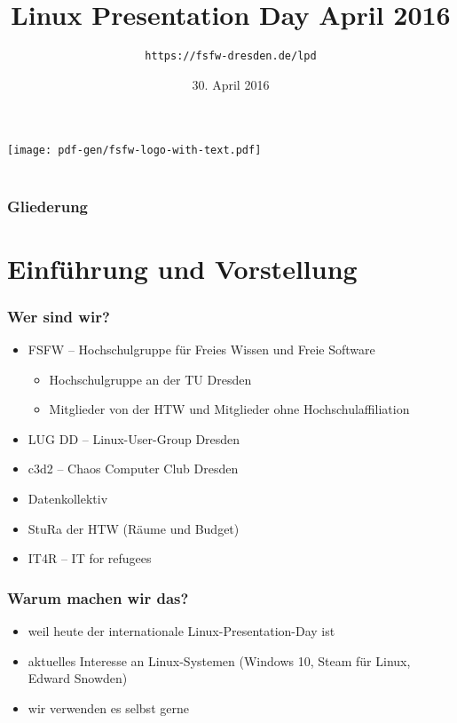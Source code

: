 \documentclass[t]{beamer}
\title{Linux Presentation Day April 2016}
\author{\texttt{https://fsfw-dresden.de/lpd}}
\date[30.04.2016]{30. April 2016}
\begin{document}
\begin{frame}
  \begin{center}%
\texttt{[image: pdf-gen/fsfw-logo-with-text.pdf]}\\%
\vspace*{-1em}{Freie Software Freies Wissen}\\[1em]
  \end{center}
\end{frame}

\begin{frame}
  \frametitle{Gliederung}
  \tableofcontents
\end{frame}

\section{Einführung und Vorstellung}
\begin{frame}
  \frametitle{Wer sind wir?}
  \begin{itemize}
  \item FSFW – Hochschulgruppe für Freies Wissen und Freie Software
    \begin{itemize}
    \item Hochschulgruppe an der TU Dresden
    \item Mitglieder von der HTW und Mitglieder ohne
      Hochschulaffiliation
    \end{itemize}
  \item LUG DD – Linux-User-Group Dresden
  \item c3d2 – Chaos Computer Club Dresden
  \item Datenkollektiv
  \item StuRa der HTW (Räume und Budget)
  \item IT4R – IT for refugees
  \end{itemize}
\end{frame}

\begin{frame}
  \frametitle{Warum machen wir das?}
  \begin{itemize}
  \item weil heute der internationale Linux-Presentation-Day ist
  \item aktuelles Interesse an Linux-Systemen (Windows 10, Steam
    für Linux, Edward Snowden)
  \item wir verwenden es selbst gerne
  \end{itemize}
\end{frame}
\end{document}
